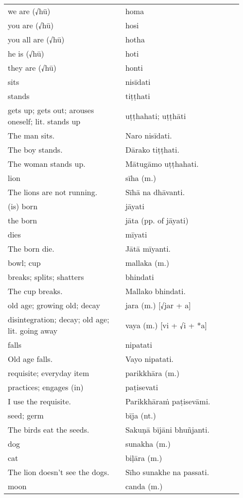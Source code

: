 \documentclass[a5paper]{memoir}
\begin{document}
\begin{longtable}{L{0.48\linewidth} L{0.48\linewidth}}
we are (√hū) & homa\\[0pt]
you are (√hū) & hosi\\[0pt]
you all are (√hū) & hotha\\[0pt]
he is (√hū) & hoti\\[0pt]
they are (√hū) & honti\\[0pt]
sits & nisīdati\\[0pt]
stands & tiṭṭhati\\[0pt]
gets up; gets out; arouses oneself; lit. stands up & uṭṭhahati; uṭṭhāti\\[0pt]
The man sits. & Naro nisīdati.\\[0pt]
The boy stands. & Dārako tiṭṭhati.\\[0pt]
The woman stands up. & Mātugāmo uṭṭhahati.\\[0pt]
lion & sīha (m.)\\[0pt]
The lions are not running. & Sīhā na dhāvanti.\\[0pt]
(is) born & jāyati\\[0pt]
the born & jāta (pp. of jāyati)\\[0pt]
dies & mīyati\\[0pt]
The born die. & Jātā mīyanti.\\[0pt]
bowl; cup & mallaka (m.)\\[0pt]
breaks; splits; shatters & bhindati\\[0pt]
The cup breaks. & Mallako bhindati.\\[0pt]
old age; growing old; decay & jara (m.) [√jar + a]\\[0pt]
disintegration; decay; old age; lit. going away & vaya (m.) [vi + √i + *a]\\[0pt]
falls & nipatati\\[0pt]
Old age falls. & Vayo nipatati.\\[0pt]
requisite; everyday item & parikkhāra (m.)\\[0pt]
practices; engages (in) & paṭisevati\\[0pt]
I use the requisite. & Parikkhāraṁ paṭisevāmi.\\[0pt]
seed; germ & bīja (nt.)\\[0pt]
The birds eat the seeds. & Sakuṇā bījāni bhuñjanti.\\[0pt]
dog & sunakha (m.)\\[0pt]
cat & biḷāra (m.)\\[0pt]
The lion doesn't see the dogs. & Sīho sunakhe na passati.\\[0pt]
moon & canda (m.)\\[0pt]

\end{longtable}
\end{document}
